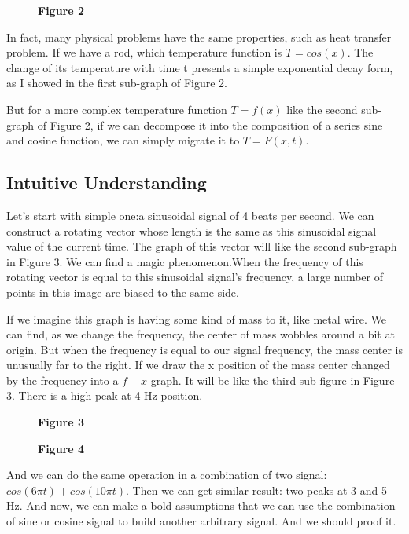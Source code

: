 \documentclass[margin,line]{res}
\begin{document}
\begin{resume}
\begin{figure}[H]
\begin{minipage}{0.55\linewidth}
    \centerline{\textbf{Figure 2}}
  \end{minipage}
\end{figure}
In fact, many physical problems have the same properties, such as heat transfer problem. If we have a rod, which temperature function is $T=cos(x)$. 
The change of its temperature with time t presents a simple exponential decay form, as I showed in the first sub-graph of Figure 2.\par
But for a more complex temperature function $T=f(x)$ like the second sub-graph of Figure 2, if we can decompose it into the composition of a series sine and cosine function, we can simply migrate it to $T=F(x,t)$.

\subsection{\textbf{Intuitive Understanding}}

Let's start with simple one:a sinusoidal signal of 4 beats per second. We can construct a rotating vector whose length is the same as this sinusoidal signal value of the current time. The graph of this vector will like the second sub-graph in Figure 3. We can find a magic phenomenon.When the frequency of this rotating vector is equal to this sinusoidal signal's frequency, a large number of points in this image are biased to the same side.\par
If we imagine this graph is having some kind of mass to it, like metal wire. We can find, as we change the frequency, the center of mass wobbles around a bit at origin. But when the frequency is equal to our signal frequency, the mass center is unusually far to the right. If we draw the x position of the mass center changed by the frequency into a $f-x$ graph. It will be like the third sub-figure in Figure 3. There is a high peak at 4 Hz position.\par
\begin{figure}[H]
	\begin{minipage}{0.48\linewidth}
		\centerline{}
		\centerline{\textbf{Figure 3}}
	\end{minipage}
	\begin{minipage}{0.48\linewidth}
		\centerline{}
		\centerline{\textbf{Figure 4}}
	\end{minipage}
\end{figure}
And we can do the same operation in a combination of two signal: $cos(6\pi t)+cos(10\pi t)$. Then we can get similar result: two peaks at 3 and 5 Hz. And now, we can make a bold assumptions that we can use the combination of sine or cosine signal to build another arbitrary signal. And we should proof it.


\end{resume}
\end{document}
